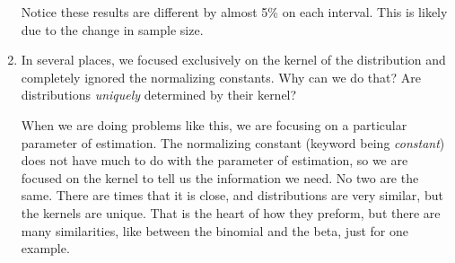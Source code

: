 \begin{enumerate}
\begin{solution}
Notice these results are different by almost 5\% on each interval. This is likely due to the change in sample size.
\end{solution}
  \item In several places, we focused exclusively on the kernel of the distribution and completely ignored the normalizing constants. Why can we do that? Are distributions \emph{uniquely} determined by their kernel?
\begin{solution}
When we are doing problems like this, we are focusing on a particular parameter of estimation. The normalizing constant (keyword being \emph{constant}) does not have much to do with the parameter of estimation, so we are focused on the kernel to tell us the information we need. No two are the same. There are times that it is close, and distributions are very similar, but the kernels are unique. That is the heart of how they preform, but there are many similarities, like between the binomial and the beta, just for one example.
\end{solution}
\end{enumerate}













